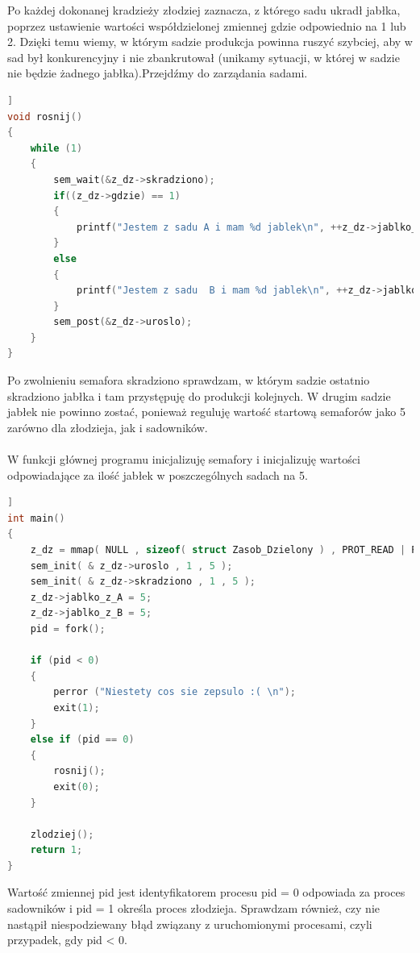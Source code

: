 \documentclass[10pt,a4paper]{article}
\begin{document}
Po każdej dokonanej kradzieży złodziej zaznacza, z którego sadu ukradł jabłka, poprzez ustawienie wartości współdzielonej zmiennej \textcolor{Fuksjowy}{gdzie} odpowiednio na \textcolor{Fuksjowy}{1}
 lub \textcolor{Fuksjowy}{2}. Dzięki temu wiemy, w którym sadzie produkcja powinna ruszyć szybciej, aby w sad był konkurencyjny i nie zbankrutował (unikamy sytuacji, w której w sadzie nie będzie żadnego jabłka).\newpage Przejdźmy do zarządania sadami.
\begin{lstlisting}[language=C,caption=Funkcja zarządzająca produkcją jabłek w sadzie,basicstyle=\footnotesize]]
void rosnij()
{
    while (1)
    {
        sem_wait(&z_dz->skradziono);
        if((z_dz->gdzie) == 1)
        {
            printf("Jestem z sadu A i mam %d jablek\n", ++z_dz->jablko_z_A);
        }
        else
        {
            printf("Jestem z sadu  B i mam %d jablek\n", ++z_dz->jablko_z_B); 
        }
        sem_post(&z_dz->uroslo);
    }
}

\end{lstlisting}
Po zwolnieniu semafora \textcolor{Fuksjowy}{skradziono} sprawdzam, w którym sadzie ostatnio skradziono jabłka i tam przystępuję do produkcji kolejnych. W drugim sadzie jabłek nie powinno zostać, ponieważ reguluję wartość startową semaforów jako 5 zarówno dla złodzieja, jak i sadowników.\\ \\
W funkcji głównej programu inicjalizuję semafory i inicjalizuję wartości odpowiadające za ilość jabłek w poszczególnych sadach na 5.
\begin{lstlisting}[language=C,caption=Funkcja głowna,basicstyle=\footnotesize]]
int main()
{
    z_dz = mmap( NULL , sizeof( struct Zasob_Dzielony ) , PROT_READ | PROT_WRITE , MAP_SHARED | MAP_ANONYMOUS , -1 , 0 );
    sem_init( & z_dz->uroslo , 1 , 5 );
    sem_init( & z_dz->skradziono , 1 , 5 );
    z_dz->jablko_z_A = 5;
    z_dz->jablko_z_B = 5;
    pid = fork();
 
    if (pid < 0)
    {
        perror ("Niestety cos sie zepsulo :( \n");
        exit(1);
    } 
    else if (pid == 0)
    {
        rosnij();
        exit(0);
    }

    zlodziej();
    return 1;
}
\end{lstlisting}
Wartość zmiennej \textcolor{Fuksjowy}{pid} jest identyfikatorem procesu pid = 0 odpowiada za proces sadowników i pid = 1 określa proces złodzieja. Sprawdzam również, czy nie nastąpił niespodziewany błąd związany z uruchomionymi procesami, czyli przypadek, gdy pid < 0.
\end{document}
